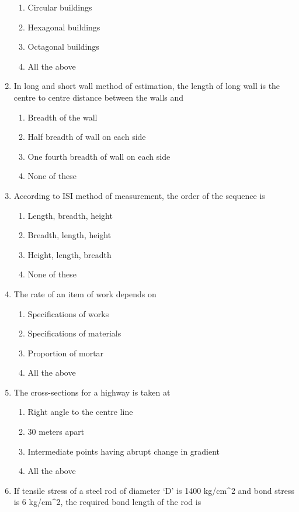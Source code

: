 \documentclass[11pt,a4paper]{article}
\begin{document}
\begin{enumerate}
\begin{enumerate}[label=\Alph*.]
\item{Circular buildings}
\item{Hexagonal buildings}
\item{Octagonal buildings}
\item{All the above}
\end{enumerate}
\item{In long and short wall method of estimation, the length of long wall is the centre to centre distance between the walls and}
\begin{enumerate}[label=\Alph*.]
\item{Breadth of the wall}
\item{Half breadth of wall on each side}
\item{One fourth breadth of wall on each side}
\item{None of these}
\end{enumerate}
\item{According to ISI method of measurement, the order of the sequence is}
\begin{enumerate}[label=\Alph*.]
\item{Length, breadth, height}
\item{Breadth, length, height}
\item{Height, length, breadth}
\item{None of these}
\end{enumerate}
\item{The rate of an item of work depends on}
\begin{enumerate}[label=\Alph*.]
\item{Specifications of works}
\item{Specifications of materials}
\item{Proportion of mortar}
\item{All the above}
\end{enumerate}
\item{The cross-sections for a highway is taken at}
\begin{enumerate}[label=\Alph*.]
\item{Right angle to the centre line}
\item{30 meters apart}
\item{Intermediate points having abrupt change in gradient}
\item{All the above}
\end{enumerate}
\item{If tensile stress of a steel rod of diameter `D' is 1400 kg/cm\^{}2 and bond stress is 6 kg/cm\^{}2, the required bond length of the rod is
}
\end{enumerate}
\end{document}
